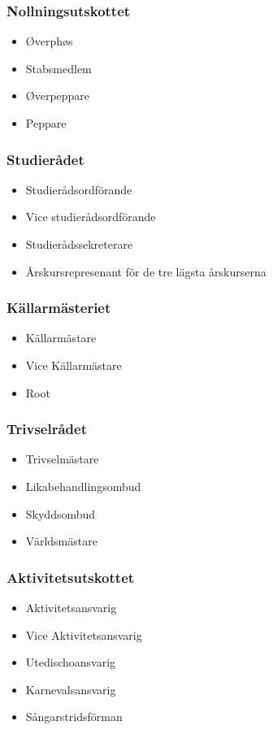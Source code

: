 \documentclass{dsekkallelse}
\begin{document}
\begin{multicols}{2}
  \subsubsection{Nollningsutskottet}
    \begin{itemize}
      \item Øverphøs
      \item Stabsmedlem
      \item \O verpeppare
      \item Peppare
    \end{itemize}
  \subsubsection{Studierådet}
    \begin{itemize}
      \item Studierådsordförande
      \item Vice studierådsordförande
      \item Studierådssekreterare
      \item Årskursrepresenant för de tre lägsta årskurserna
    \end{itemize}
  \subsubsection{Källarmästeriet}
    \begin{itemize}
      \item Källarmästare
      \item Vice Källarmästare
      \item Root
    \end{itemize}
  \subsubsection{Trivselrådet}
    \begin{itemize}
       \item Trivselmästare
       \item Likabehandlingsombud
       \item Skyddsombud
       \item Världsmästare
    \end{itemize}
  \subsubsection{Aktivitetsutskottet}
    \begin{itemize}
      \item Aktivitetsansvarig
      \item Vice Aktivitetsansvarig
      \item Utedischoansvarig
      \item Karnevalsansvarig
      \item Sångarstridsförman
    \end{itemize}

\end{multicols}
\end{document}

